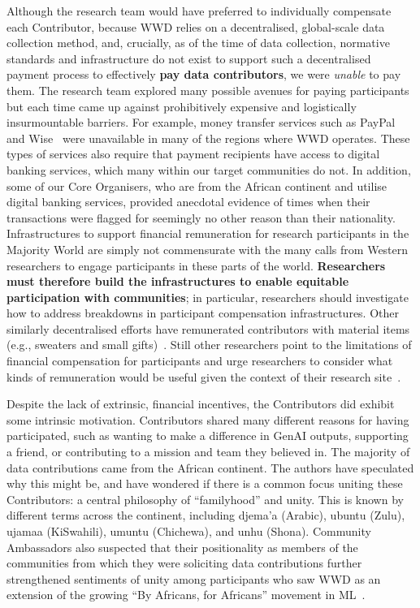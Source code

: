 Although the research team would have preferred to individually compensate each Contributor, because \textsc{WWD} relies on a decentralised, global-scale data collection method, and, crucially, as of the time of data collection, normative standards and infrastructure do not exist to support such a decentralised payment process to effectively \textbf{pay data contributors}, we were \textit{unable} to pay them. The research team explored many possible avenues for paying participants but each time came up against prohibitively expensive and logistically insurmountable barriers. For example, money transfer services such as PayPal~\cite{paypal_countries_2023} and Wise~\cite{wise_usage_2023} were unavailable in many of the regions where \textsc{WWD} operates. These types of services also require that payment recipients have access to digital banking services, which many within our target communities do not. In addition, some of our Core Organisers, who are from the African continent and utilise digital banking services, provided anecdotal evidence of times when their transactions were flagged for seemingly no other reason than their nationality. Infrastructures to support financial remuneration for research participants in the Majority World are simply not commensurate with the many calls from Western researchers to engage participants in these parts of the world. \textbf{Researchers must therefore build the infrastructures to enable equitable participation with communities}; in particular, researchers should investigate how to address breakdowns in participant compensation infrastructures. Other similarly decentralised efforts have remunerated contributors with material items (e.g., sweaters and small gifts)~\cite{singh2024aya_dataset}. Still other researchers point to the limitations of financial compensation for participants and urge researchers to consider what kinds of remuneration would be useful given the context of their research site~\cite{hodge2020relational}.

Despite the lack of extrinsic, financial incentives, the Contributors did exhibit some intrinsic motivation. Contributors shared many different reasons for having participated, such as wanting to make a difference in GenAI outputs, supporting a friend, or contributing to a mission and team they believed in. The majority of data contributions came from the African continent. The authors have speculated why this might be, and have wondered if there is a common focus uniting these Contributors: a central philosophy of ``familyhood'' and unity. This is known by different terms across the continent, including djema’a (Arabic), ubuntu (Zulu), ujamaa (KiSwahili), umuntu (Chichewa), and unhu (Shona). Community Ambassadors also suspected that their positionality as members of the communities from which they were soliciting data contributions further strengthened sentiments of unity among participants who saw \textsc{WWD} as an extension of the growing ``By Africans, for Africans'' movement in ML~\cite{birhane_2024_for_africans}. 

